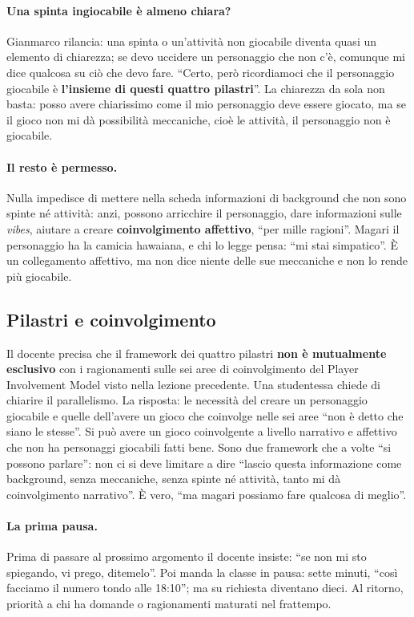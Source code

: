 \paragraph{Una spinta ingiocabile è almeno chiara?} Gianmarco rilancia: una spinta o
un'attività non giocabile diventa quasi un elemento di chiarezza; se devo uccidere
un personaggio che non c'è, comunque mi dice qualcosa su ciò che devo fare.
``Certo, però ricordiamoci che il personaggio giocabile è \textbf{l'insieme di questi
quattro pilastri}''. La chiarezza da sola non basta: posso avere chiarissimo come
il mio personaggio deve essere giocato, ma se il gioco non mi dà possibilità
meccaniche, cioè le attività, il personaggio non è giocabile.

\paragraph{Il resto è permesso.} Nulla impedisce di mettere nella scheda
informazioni di background che non sono spinte né attività: anzi, possono
arricchire il personaggio, dare informazioni sulle \emph{vibes}, aiutare a creare
\textbf{coinvolgimento affettivo}, ``per mille ragioni''. Magari il personaggio ha la
camicia hawaiana, e chi lo legge pensa: ``mi stai simpatico''. È un collegamento
affettivo, ma non dice niente delle sue meccaniche e non lo rende più giocabile.

\subsection{Pilastri e coinvolgimento}

Il docente precisa che il framework dei quattro pilastri \textbf{non è mutualmente
esclusivo} con i ragionamenti sulle sei aree di coinvolgimento del Player
Involvement Model visto nella lezione precedente. Una studentessa chiede di
chiarire il parallelismo. La risposta: le necessità del creare un personaggio
giocabile e quelle dell'avere un gioco che coinvolge nelle sei aree ``non è detto
che siano le stesse''. Si può avere un gioco coinvolgente a livello narrativo e
affettivo che non ha personaggi giocabili fatti bene. Sono due framework che a volte
``si possono parlare'': non ci si deve limitare a dire ``lascio questa informazione
come background, senza meccaniche, senza spinte né attività, tanto mi dà
coinvolgimento narrativo''. È vero, ``ma magari possiamo fare qualcosa di meglio''.

\paragraph{La prima pausa.} Prima di passare al prossimo argomento il docente
insiste: ``se non mi sto spiegando, vi prego, ditemelo''. Poi manda la classe in
pausa: sette minuti, ``così facciamo il numero tondo alle 18:10''; ma su richiesta
diventano dieci. Al ritorno, priorità a chi ha domande o ragionamenti maturati nel
frattempo.

